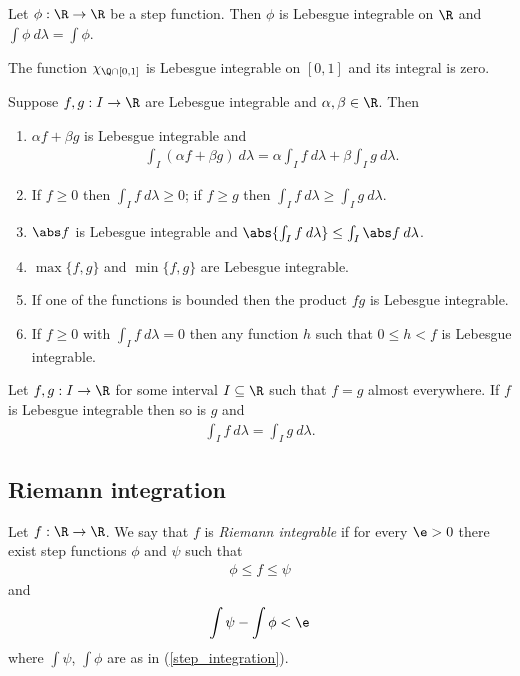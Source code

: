 \documentclass{article}
\begin{document}
\begin{corollary}
	Let $\phi:\R\to\R$ be a step function. Then $\phi$ is Lebesgue integrable on $\R$
	and $\int\phi\:d\lambda = \int\phi$.
\end{corollary}

\begin{corollary}
	The function $\chi_{\Q\cap[0,1]}$ is Lebesgue integrable on $[0,1]$ and its integral is zero.
\end{corollary}

\begin{theorem}[Notes 4.2]
	Suppose $f,g:I\to\R$ are Lebesgue integrable and $\alpha,\beta\in\R$. Then
	\begin{enumerate}
		\item $\alpha f + \beta g$ is Lebesgue integrable and \begin{align*}
			      \int_I (\alpha f + \beta g)\:d\lambda = \alpha \int_I f\:d\lambda + \beta \int_I g\:d\lambda.
		      \end{align*}
		\item If $f\geq 0$ then $\int_I f\:d\lambda \geq 0$; if $f\geq g$ then
		      $\int_I f\:d\lambda\geq \int_I g\:d\lambda$.
		\item $\abs f$ is Lebesgue integrable and $\abs{\int_I f\:d\lambda}\leq \int_I \abs f\:d\lambda$.
		\item $\max\{f,g\}$ and $\min\{f,g\}$ are Lebesgue integrable.
		\item If one of the functions is bounded then the product $fg$ is Lebesgue integrable.
		\item If $f\geq 0$ with $\int_I f\:d\lambda = 0$ then any function $h$ such that $0\leq h<f$ is Lebesgue integrable.
	\end{enumerate}
\end{theorem}

\begin{lemma}[Exercise 4.6]
	Let $f,g:I\to\R$ for some interval $I\subseteq\R$ such that $f=g$ almost everywhere.
	If $f$ is Lebesgue integrable then so is $g$ and
	\begin{align*}
		\int_I f\:d\lambda = \int_I g\:d\lambda.
	\end{align*}
\end{lemma}

\subsection{Riemann integration}

\begin{definition}
	Let $f:\R\to\R$. We say that $f$ is \emph{Riemann integrable} if for every
	$\e>0$ there exist step functions $\phi$ and $\psi$ such that
	\begin{align*}
		\phi \leq f \leq \psi
	\end{align*}
	and
	\begin{align*}
		\int \psi - \int \phi < \e
	\end{align*}
	where $\int\psi$, $\int\phi$ are as in (\ref{step_integration}).
\end{definition}
\end{document}

